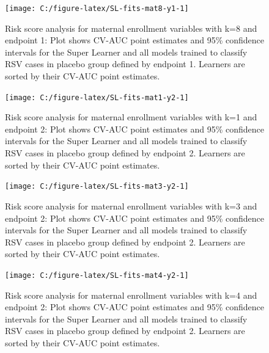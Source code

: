\documentclass[11pt]{article}
\begin{document}
\begin{figure}[H]

{\centering \texttt{[image: C:/figure-latex/SL-fits-mat8-y1-1]} 

}

\caption[Risk score analysis for maternal enrollment variables with k=8 and endpoint 1.]{Risk score analysis for maternal enrollment variables with k=8 and endpoint 1: Plot shows CV-AUC point estimates and 95\% confidence intervals for the Super Learner and all models trained to classify RSV cases in placebo group defined by endpoint 1. Learners are sorted by their CV-AUC point estimates.}\label{fig:SL-fits-mat8-y1}
\end{figure}

\clearpage

\begin{figure}[H]

{\centering \texttt{[image: C:/figure-latex/SL-fits-mat1-y2-1]} 

}

\caption[Risk score analysis for maternal enrollment variables with k=1 and endpoint 2.]{Risk score analysis for maternal enrollment variables with k=1 and endpoint 2: Plot shows CV-AUC point estimates and 95\% confidence intervals for the Super Learner and all models trained to classify RSV cases in placebo group defined by endpoint 2. Learners are sorted by their CV-AUC point estimates.}\label{fig:SL-fits-mat1-y2}
\end{figure}

\begin{figure}[H]

{\centering \texttt{[image: C:/figure-latex/SL-fits-mat3-y2-1]} 

}

\caption[Risk score analysis for maternal enrollment variables with k=3 and endpoint 2.]{Risk score analysis for maternal enrollment variables with k=3 and endpoint 2: Plot shows CV-AUC point estimates and 95\% confidence intervals for the Super Learner and all models trained to classify RSV cases in placebo group defined by endpoint 2. Learners are sorted by their CV-AUC point estimates.}\label{fig:SL-fits-mat3-y2}
\end{figure}

\begin{figure}[H]

{\centering \texttt{[image: C:/figure-latex/SL-fits-mat4-y2-1]} 

}

\caption[Risk score analysis for maternal enrollment variables with k=4 and endpoint 2.]{Risk score analysis for maternal enrollment variables with k=4 and endpoint 2: Plot shows CV-AUC point estimates and 95\% confidence intervals for the Super Learner and all models trained to classify RSV cases in placebo group defined by endpoint 2. Learners are sorted by their CV-AUC point estimates.}\label{fig:SL-fits-mat4-y2}
\end{figure}
\end{document}
